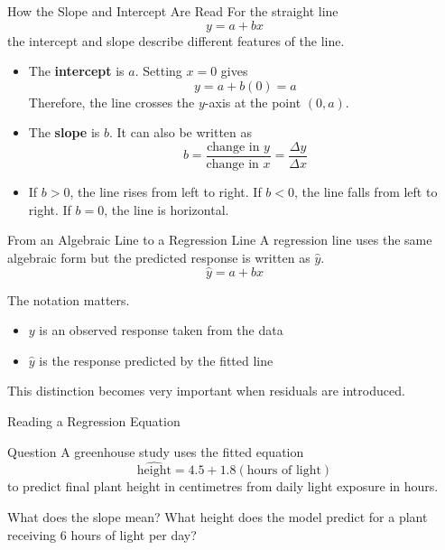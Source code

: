 \documentclass[aspectratio=169]{beamer}
\begin{document}
\begin{frame}{How the Slope and Intercept Are Read}
For the straight line
$$y=a+bx$$
the intercept and slope describe different features of the line.

\begin{itemize}
	\item The \textbf{intercept} is $a$. Setting $x=0$ gives
	$$y=a+b(0)=a$$
	Therefore, the line crosses the $y$-axis at the point $(0,a)$.
	\item The \textbf{slope} is $b$. It can also be written as
	$$b=\frac{\text{change in }y}{\text{change in }x} =\frac{\Delta y}{\Delta x}$$
	\item If $b>0$, the line rises from left to right. If $b<0$, the line falls from left to right. If $b=0$, the line is horizontal.
\end{itemize}
\end{frame}

\begin{frame}{From an Algebraic Line to a Regression Line}
A regression line uses the same algebraic form but the predicted response is written as $\hat y$.
\[
\hat y=a+bx
\]

The notation matters.
\begin{itemize}
  \item $y$ is an observed response taken from the data
  \item $\hat y$ is the response predicted by the fitted line
\end{itemize}

This distinction becomes very important when residuals are introduced.
\end{frame}

\begin{frame}{Reading a Regression Equation}
\begin{block}{Question}
A greenhouse study uses the fitted equation
\[
\widehat{\text{height}}=4.5+1.8(\text{hours of light})
\]
to predict final plant height in centimetres from daily light exposure in hours.

What does the slope mean? What height does the model predict for a plant receiving 6 hours of light per day?
\end{block}
\end{frame}
\end{document}
